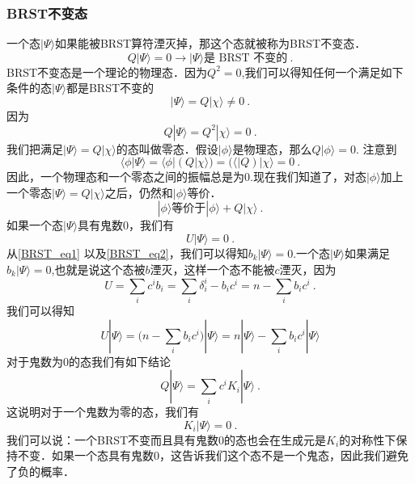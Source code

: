 \subsubsection{BRST不变态}
一个态$|\Psi\rangle$如果能被BRST算符湮灭掉，那这个态就被称为BRST不变态．
\begin{equation}
Q|\Psi\rangle = 0 \rightarrow |\Psi\rangle \text{是 BRST 不变的}~.
\end{equation}
BRST不变态是一个理论的物理态．因为$Q^2=0$,我们可以得知任何一个满足如下条件的态$|\Psi\rangle$都是BRST不变的
\begin{equation}
|\Psi\rangle = Q |\chi\rangle \neq 0~.
\end{equation}
因为
\begin{equation}
Q|\Psi\rangle = Q^2 |\chi\rangle = 0~.
\end{equation}
我们把满足$|\Psi\rangle=Q|\chi\rangle$的态叫做零态．假设$|\phi\rangle$是物理态，那么$Q|\phi\rangle=0$. 注意到
\begin{equation}
\langle\phi|\Psi\rangle = \langle\phi|(Q|\chi\rangle) = (\langle | Q) |\chi\rangle = 0~.
\end{equation}
因此，一个物理态和一个零态之间的振幅总是为0.现在我们知道了，对态$|\phi\rangle$加上一个零态$|\Psi\rangle = Q|\chi\rangle$之后，仍然和$|\phi\rangle$等价．
\begin{equation}
|\phi\rangle \text{等价于} |\phi\rangle+Q|\chi\rangle~.
\end{equation}
如果一个态$|\Psi\rangle$具有鬼数0，我们有
\begin{equation}\label{BRST_eq2}
U|\Psi\rangle = 0~.
\end{equation}
从\autoref{BRST_eq1} 以及\autoref{BRST_eq2}，我们可以得知$b_k|\Psi\rangle = 0$.一个态$|\Psi\rangle$如果满足$b_k|\Psi\rangle = 0$,也就是说这个态被$b$湮灭，这样一个态不能被$c$湮灭，因为
\begin{equation}
U = \sum_i c^i b_i = \sum_i \delta^i_i - b_i c^i = n - \sum_i b_i c^i~.
\end{equation}
我们可以得知
\begin{equation}
U|\Psi\rangle = \bigg( n - \sum_i b_i c^i \bigg) | \Psi\rangle = n|\Psi\rangle - \sum_i b_i c^i |\Psi\rangle
\end{equation}
对于鬼数为0的态我们有如下结论
\begin{equation}
Q|\Psi\rangle = \sum_i c^i K_i |\Psi\rangle~.
\end{equation}
这说明对于一个鬼数为零的态，我们有
\begin{equation}
K_i|\Psi\rangle = 0~.
\end{equation}
我们可以说：一个BRST不变而且具有鬼数0的态也会在生成元是$K_i$的对称性下保持不变．如果一个态具有鬼数0，这告诉我们这个态不是一个鬼态，因此我们避免了负的概率．

